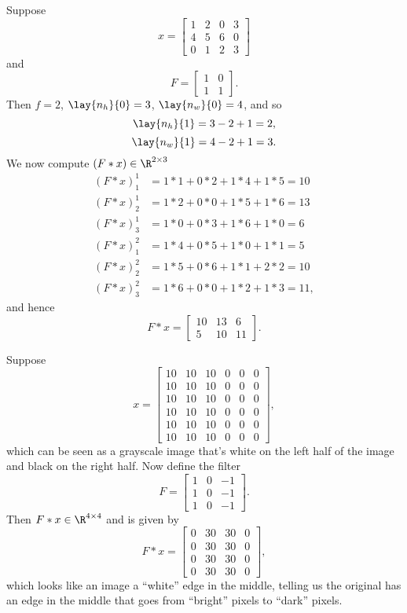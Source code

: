\begin{ex}
	Suppose
	$$x=\begin{bmatrix}
		1&2&0&3\\
		4&5&6&0\\
		0&1&2&3
	\end{bmatrix}$$
	and
	$$F=\begin{bmatrix}
		1&0\\
		1&1
	\end{bmatrix}.$$
	Then $f=2$, $\lay{n_h}{0}=3$, $\lay{n_w}{0}=4$, and so
	$$\lay{n_h}{1}=3-2+1=2,$$
	$$\lay{n_w}{1}=4-2+1=3.$$
	We now compute $(F*x)\in\R^{2\times 3}$
	\begin{align*}
		(F*x)^1_1&=1*1+0*2+1*4+1*5=10\\
		(F*x)^1_2&=1*2+0*0+1*5+1*6=13\\
		(F*x)^1_3&=1*0+0*3+1*6+1*0=6\\
		(F*x)^2_1&=1*4+0*5+1*0+1*1=5\\
		(F*x)^2_2&=1*5+0*6+1*1+2*2=10\\
		(F*x)^2_3&=1*6+0*0+1*2+1*3=11,
	\end{align*}
	and hence
	$$F*x=\begin{bmatrix}
		10&13&6\\
		5&10&11
	\end{bmatrix}.$$
\end{ex}

\begin{ex}
	Suppose
	$$x=\begin{bmatrix}
		10&10&10&0&0&0\\
		10&10&10&0&0&0\\
		10&10&10&0&0&0\\
		10&10&10&0&0&0\\
		10&10&10&0&0&0\\
		10&10&10&0&0&0
	\end{bmatrix},$$
	which can be seen as a grayscale image that's white on the left half of the image and black on the right half.  Now define the filter
	$$F=\begin{bmatrix}
		1&0&-1\\
		1&0&-1\\
		1&0&-1
	\end{bmatrix}.$$
	Then $F*x\in\R^{4\times 4}$ and is given by
	$$F*x=\begin{bmatrix}
		0&30&30&0\\
		0&30&30&0\\
		0&30&30&0\\
		0&30&30&0
	\end{bmatrix},$$
	which looks like an image a ``white'' edge in the middle, telling us the original has an edge in the middle that goes from ``bright'' pixels to ``dark'' pixels.
\end{ex}

